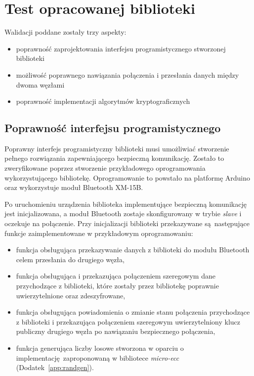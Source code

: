 \chapter{Test opracowanej biblioteki}
\label{cha:walidacja}

Walidacji poddane zostały trzy aspekty:

\begin{itemize}
\item poprawność zaprojektowania interfejsu programistycznego stworzonej biblioteki
\item możliwość poprawnego nawiązania połączenia i przesłania danych między dwoma węzłami
\item poprawność implementacji algorytmów kryptograficznych
\end{itemize}

\section{Poprawność interfejsu programistycznego}

Poprawny interfejs programistyczny biblioteki musi umożliwiać stworzenie pełnego rozwiązania zapewniającego bezpieczną komunikację. Zostało to zweryfikowane poprzez stworzenie przykładowego oprogramowania wykorzystującego bibliotekę. Oprogramowanie to powstało na platformę Arduino oraz wykorzystuje moduł Bluetooth XM-15B.

Po uruchomieniu urządzenia biblioteka implementujące bezpieczną komunikację jest inicjalizowana, a moduł Bluetooth zostaje skonfigurowany w trybie \emph{slave} i oczekuje na połączenie. Przy inicjalizacji biblioteki przekazywane są następujące funkcje zaimplementowane w przykładowym oprogramowaniu:

\begin{itemize}
    \item funkcja obsługująca przekazywanie danych z biblioteki do modułu Bluetooth celem przesłania do drugiego węzła,
    \item funkcja obsługująca i przekazująca połączeniem szeregowym dane przychodzące z biblioteki, które zostały przez bibliotekę poprawnie uwierzytelnione oraz zdeszyfrowane,
    \item funkcja obsługująca powiadomienia o zmianie stanu połączenia przychodzące z biblioteki i przekazująca połączeniem szeregowym uwierzytelniony klucz publiczny drugiego węzła po nawiązaniu bezpiecznego połączenia,
    \item funkcja generująca liczby losowe stworzona w oparciu o implementację zaproponowaną w bibliotece {\itshape micro-ecc} (Dodatek~\ref{app:randgen}).
\end{itemize}

